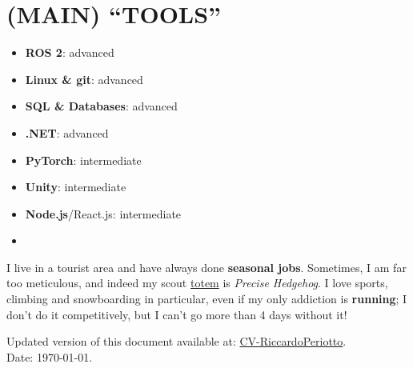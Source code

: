 \documentclass[11 pt,oneside,a4paper,titlepage]{article}
\begin{document}
{\begin{minipage}{11.3cm}
        \section*{{\faDesktop} (MAIN) “TOOLS” }
        \vspace*{-0.5cm}
        \begin{multicols}{2}    
        \begin{itemize}
        \footnotesize
            \item \textbf{ROS 2}: advanced
            \item \textbf{Linux \& git}: advanced
            \item \textbf{SQL \& Databases}: advanced
            \item \textbf{.NET}: advanced
            \item \textbf{PyTorch}: intermediate
            \item \textbf{Unity}: intermediate
            \item \textbf{Node.js}/React.js: intermediate    
            \item[\vspace{\fill}]
        \end{itemize}
        \end{multicols}
        

        I live in a tourist area and have always done \textbf{seasonal jobs}. Sometimes, I am far too meticulous, and indeed my scout \href{https://it.wikipedia.org/wiki/Totem_(nome_scout)}{totem} is \textit{Precise Hedgehog}. I love sports, climbing and snowboarding in particular, even if my only addiction is \textbf{running}; I don't do it competitively, but I can't go more than 4 days without it!
        
        \vspace*{0.18cm}
        Updated version of this document available at: \href{https://riccardoperiotto.github.io/CurriculumVitae/CV-RiccardoPeriotto.pdf}{CV-RiccardoPeriotto}. \\
        Date: \today.
    \end{minipage}} %
\end{document}
